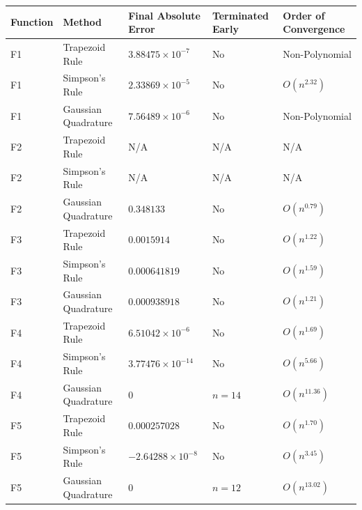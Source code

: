 \documentclass[12pt]{article}
\begin{document}
\begin{center}
	\begin{small}
		\begin{tabular}{| l | l | p{25mm} | p{17mm} | p{35mm} |}
			\hline
			Function & Method              & Final Absolute Error      & Terminated Early & Order of Convergence \\
			\hline
			F1       & Trapezoid Rule      & $3.88475 \times 10^{-7}$  & No               & Non-Polynomial       \\
			\hline
			F1       & Simpson's Rule      & $2.33869 \times 10^{-5}$  & No               & $O(n^{2.32})$        \\
			\hline
			F1       & Gaussian Quadrature & $7.56489 \times 10^{-6}$  & No               & Non-Polynomial       \\
			\hline
			F2       & Trapezoid Rule      & N/A                       & N/A              & N/A                  \\
			\hline
			F2       & Simpson's Rule      & N/A                       & N/A              & N/A                  \\
			\hline
			F2       & Gaussian Quadrature & $0.348133$                & No               & $O(n^{0.79})$        \\
			\hline
			F3       & Trapezoid Rule      & $0.0015914$               & No               & $O(n^{1.22})$        \\
			\hline
			F3       & Simpson's Rule      & $0.000641819$             & No               & $O(n^{1.59})$        \\
			\hline
			F3       & Gaussian Quadrature & $0.000938918$             & No               & $O(n^{1.21})$        \\
			\hline
			F4       & Trapezoid Rule      & $6.51042 \times 10^{-6}$  & No               & $O(n^{1.69})$        \\
			\hline
			F4       & Simpson's Rule      & $3.77476 \times 10^{-14}$ & No               & $O(n^{5.66})$        \\
			\hline
			F4       & Gaussian Quadrature & $0$                       & $n = 14$         & $O(n^{11.36})$       \\
			\hline
			F5       & Trapezoid Rule      & $0.000257028$             & No               & $O(n^{1.70})$        \\
			\hline
			F5       & Simpson's Rule      & $-2.64288 \times 10^{-8}$ & No               & $O(n^{3.45})$        \\
			\hline
			F5       & Gaussian Quadrature & $0$                       & $n = 12$         & $O(n^{13.02})$       \\
			\hline
		\end{tabular}
	\end{small}
\end{center}
\end{document}
